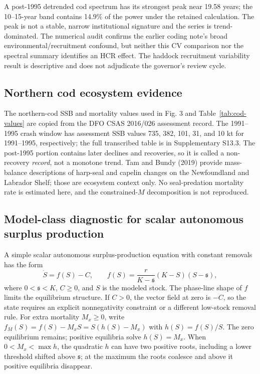 A post-1995 detrended cod spectrum has its strongest peak near 19.58 years; the 10--15-year band contains 14.9\% of the power under the retained calculation. The peak is not a stable, narrow institutional signature and the series is trend-dominated. The numerical audit confirms the earlier coding note's broad environmental/recruitment confound, but neither this CV comparison nor the spectral summary identifies an HCR effect. The haddock recruitment variability result is descriptive and does not adjudicate the governor's review cycle.

\subsection{Northern cod ecosystem evidence}

The northern-cod SSB and mortality values used in Fig. 3 and Table~\ref{tab:cod-values} are copied from the DFO CSAS 2016/026 assessment record. The 1991--1995 crash window has assessment SSB values 735, 382, 101, 31, and 10 kt for 1991--1995, respectively; the full transcribed table is in Supplementary S13.3. The post-1995 portion contains later declines and recoveries, so it is called a non-recovery \emph{record}, not a monotone trend. Tam and Bundy (2019) provide mass-balance descriptions of harp-seal and capelin changes on the Newfoundland and Labrador Shelf; those are ecosystem context only. No seal-predation mortality rate is estimated here, and the constrained-\(M\) decomposition is not reproduced.

\subsection{Model-class diagnostic for scalar autonomous surplus production}

A simple scalar autonomous surplus-production equation with constant removals has the form
\[
\dot S=f(S)-C,\qquad f(S)=\frac{r}{K-\mathfrak s}(K-S)(S-\mathfrak s),
\]
where \(0<\mathfrak s<K\), \(C\geq0\), and \(S\) is the modeled stock. The phase-line shape of \(f\) limits the equilibrium structure. If \(C>0\), the vector field at zero is \(-C\), so the state requires an explicit nonnegativity constraint or a different low-stock removal rule. For extra mortality \(M_x\geq0\), write \(f_M(S)=f(S)-M_xS=S(h(S)-M_x)\) with \(h(S)=f(S)/S\). The zero equilibrium remains; positive equilibria solve \(h(S)=M_x\). When \(0<M_x<\max h\), the quadratic \(h\) can have two positive roots, including a lower threshold shifted above \(\mathfrak s\); at the maximum the roots coalesce and above it positive equilibria disappear.

